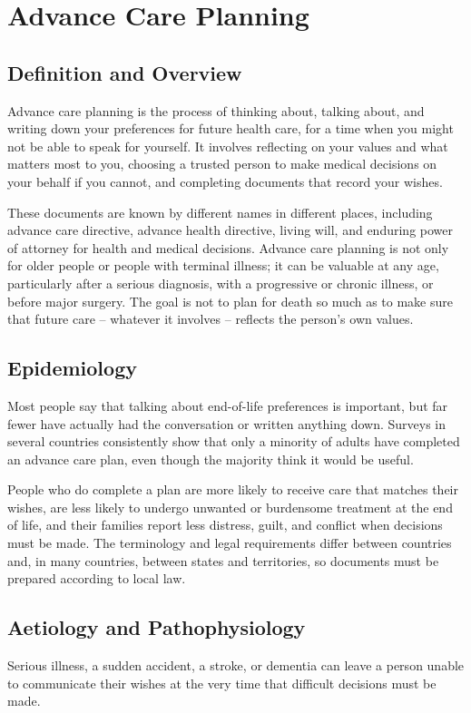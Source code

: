 \chapter{Advance Care Planning}

\section*{Definition and Overview}
Advance care planning is the process of thinking about, talking about, and writing down your preferences for future health care, for a time when you might not be able to speak for yourself. It involves reflecting on your values and what matters most to you, choosing a trusted person to make medical decisions on your behalf if you cannot, and completing documents that record your wishes.

These documents are known by different names in different places, including advance care directive, advance health directive, living will, and enduring power of attorney for health and medical decisions. Advance care planning is not only for older people or people with terminal illness; it can be valuable at any age, particularly after a serious diagnosis, with a progressive or chronic illness, or before major surgery. The goal is not to plan for death so much as to make sure that future care -- whatever it involves -- reflects the person's own values.

\section*{Epidemiology}
Most people say that talking about end-of-life preferences is important, but far fewer have actually had the conversation or written anything down. Surveys in several countries consistently show that only a minority of adults have completed an advance care plan, even though the majority think it would be useful.

People who do complete a plan are more likely to receive care that matches their wishes, are less likely to undergo unwanted or burdensome treatment at the end of life, and their families report less distress, guilt, and conflict when decisions must be made. The terminology and legal requirements differ between countries and, in many countries, between states and territories, so documents must be prepared according to local law.

\section*{Aetiology and Pathophysiology}
Serious illness, a sudden accident, a stroke, or dementia can leave a person unable to communicate their wishes at the very time that difficult decisions must be made.

